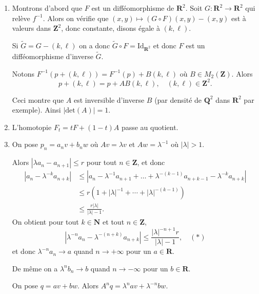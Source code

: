 \documentclass[a4paper,12pt,openany]{article}
\theoremstyle{plain}
\theoremstyle{definition}
\newcommand{\R}{\mathbf{R}}
\newcommand{\Z}{\mathbf{Z}}
\newcommand{\N}{\mathbf{N}}
\newcommand{\Q}{\mathbf{Q}}
\newcommand{\Id}{\mathrm{Id}}
\begin{document}
\begin{enumerate}[resume]
\item Montrons d'abord que $F$ est un diff\'eomorphisme de $\R^2$. Soit $G : \R^2 \to \R^2$ qui rel\`eve $f^{-1}$. Alors on v\'erifie que $(x,y) \mapsto (G \circ F)(x,y) - (x,y)$ est \`a valeurs dans $\Z^2$, donc constante, disons \'egale \`a $(k, \ell)$. 




Si $\tilde G = G - (k, \ell)$ on a donc $\tilde G \circ F = \Id_{\R^2}$ et donc $F$ est un diff\'eomorphisme d'inverse $\tilde G$.




Notons $F^{-1}(p + (k, \ell)) = F^{-1}(p) + B(k, \ell)$ o\`u $B \in M_2(\Z).$ Alors 
$$
p + (k, \ell) = p + AB(k, \ell), \quad (k, \ell) \in \Z^2.
$$


%
Ceci montre que $A$ est inversible d'inverse $B$ (par densit\'e de $\Q^2$ dans $\R^2$ par exemple). Ainsi $|\mathrm{det}(A)| = 1$.

\item L'homotopie $F_t = tF + (1-t)A$ passe au quotient.

\item On pose $p_n = a_n v + b_n w$ o\`u $Av = \lambda v$ et $A w = \lambda^{-1}$ o\`u $|\lambda| > 1.$




Alors $|\lambda a_n - a_{n+1}| \leqslant r$ pour tout $n \in \Z$, et donc 
$$
\begin{aligned}
\left|a_n - \lambda^{-k}a_{n+k}\right| &\leqslant \left|a_n - \lambda^{-1}a_{n+1} + \dots + \lambda^{-(k-1)}a_{n+k-1} - \lambda^{-k}a_{n+k}\right| \\ 
&\leqslant r\left(1 + |\lambda|^{-1} + \cdots + |\lambda|^{-(k-1)}\right) \\
& \leqslant \frac{r|\lambda|}{|\lambda| - 1}.
\end{aligned}
$$
On obtient pour tout $k \in \N$ et tout $n \in \Z$,
$$
\left|\lambda^{-n}a_n-\lambda^{-(n+k)}a_{n+k}\right| \leqslant \frac{|\lambda|^{-n+1}r}{|\lambda|-1}, \quad (*)
$$
et donc $\lambda^{-n}a_n \to a$ quand $n \to +\infty$ pour un $a \in \R$.



De m\^eme on a $\lambda^{n} b_{n} \to b$ quand $n \to -\infty$ pour un $b \in \R$.





On pose $q = av + bw$. Alors
$
A^nq =\lambda^na v + \lambda^{-n}bw.
$




\end{enumerate}
\end{document}
